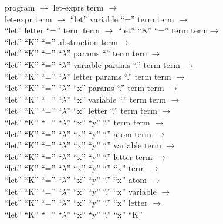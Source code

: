 \documentclass{article}
\begin{document}
program $\rightarrow$ let-exprs term $\rightarrow$\\
let-expr term $\rightarrow$ ``let'' variable ``='' term term $\rightarrow$\\
``let'' letter ``='' term term $\rightarrow$ ``let'' ``K'' ``='' term term$\rightarrow$\\
``let'' ``K'' ``='' abstraction term$\rightarrow$\\
``let'' ``K'' ``='' ``$\lambda$'' params ``.'' term term$\rightarrow$\\
``let'' ``K'' ``='' ``$\lambda$'' variable params  ``.'' term term $\rightarrow$\\
``let'' ``K'' ``='' ``$\lambda$'' letter params  ``.'' term term $\rightarrow$\\
``let'' ``K'' ``='' ``$\lambda$'' ``x'' params  ``.'' term term $\rightarrow$\\
``let'' ``K'' ``='' ``$\lambda$'' ``x'' variable  ``.'' term term $\rightarrow$\\
``let'' ``K'' ``='' ``$\lambda$'' ``x'' letter  ``.'' term term $\rightarrow$\\
``let'' ``K'' ``='' ``$\lambda$'' ``x'' ``y''  ``.'' term term $\rightarrow$\\
``let'' ``K'' ``='' ``$\lambda$'' ``x'' ``y''  ``.'' atom term $\rightarrow$\\
``let'' ``K'' ``='' ``$\lambda$'' ``x'' ``y''  ``.'' variable term $\rightarrow$\\
``let'' ``K'' ``='' ``$\lambda$'' ``x'' ``y''  ``.'' letter term $\rightarrow$\\
``let'' ``K'' ``='' ``$\lambda$'' ``x'' ``y''  ``.'' ``x'' term $\rightarrow$\\
``let'' ``K'' ``='' ``$\lambda$'' ``x'' ``y''  ``.'' ``x'' atom $\rightarrow$\\
``let'' ``K'' ``='' ``$\lambda$'' ``x'' ``y''  ``.'' ``x'' variable $\rightarrow$\\
``let'' ``K'' ``='' ``$\lambda$'' ``x'' ``y''  ``.'' ``x'' letter $\rightarrow$\\
``let'' ``K'' ``='' ``$\lambda$'' ``x'' ``y''  ``.'' ``x'' ``K''\\
\end{document}
